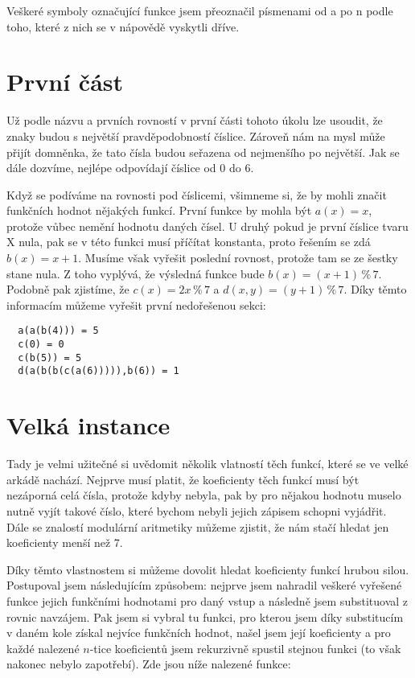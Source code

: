 \documentclass{fkssolpub}
\author{Ondřej Sedláček}
\begin{document}
Veškeré symboly označující funkce jsem přeoznačil písmenami od a po
n podle toho, které z nich se v nápovědě vyskytli dříve.

\section{První část}

Už podle názvu a prvních rovností v první části tohoto úkolu
lze usoudit, že znaky budou s největší pravděpodobností
číslice. Zároveň nám na mysl může přijít domněnka, že tato čísla budou
seřazena od nejmenšího po největší. Jak se dále dozvíme, nejlépe
odpovídají číslice od 0 do 6.

Když se podíváme na rovnosti pod číslicemi, všimneme si, že by
mohli značit funkčních hodnot nějakých funkcí. První funkce by
mohla být $a(x) = x$, protože vůbec nemění hodnotu daných čísel.
U druhý pokud je první číslice tvaru X nula, pak se v této funkci
musí příčítat konstanta, proto řešením se zdá $b(x) = x + 1$. Musíme však
vyřešit poslední rovnost, protože tam se ze šestky stane nula.
Z toho vyplývá, že výsledná funkce bude $b(x) = (x + 1) \, \% \, 7$.
Podobně pak zjistíme, že $c(x) = 2x \, \% \, 7$ a 
$d(x, y) = (y + 1) \, \% \, 7$.
Díky těmto informacím můžeme vyřešit první nedořešenou sekci:

\begin{verbatim}
  a(a(b(4))) = 5 
  c(0) = 0 
  c(b(5)) = 5 
  d(a(b(b(c(a(6))))),b(6)) = 1 
\end{verbatim}

\section{Velká instance}

Tady je velmi užitečné si uvědomit několik vlatností těch funkcí,
které se ve velké arkádě nachází. Nejprve musí platit, že koeficienty
těch funkcí musí být nezáporná celá čísla, protože kdyby nebyla, pak by pro
nějakou hodnotu muselo nutně vyjít takové číslo, které bychom
nebyli jejich zápisem schopni vyjádřit. Dále se znalostí modulární
aritmetiky můžeme zjistit, že nám stačí hledat jen koeficienty menší
než 7.

Díky těmto vlastnostem si můžeme dovolit hledat koeficienty funkcí
hrubou silou. Postupoval jsem následujícím způsobem: nejprve jsem
nahradil veškeré vyřešené funkce jejich funkčními hodnotami pro daný
vstup a následně jsem substituoval z rovnic navzájem. Pak jsem si
vybral tu funkci, pro kterou jsem díky substitucím v daném kole
získal nejvíce funkčních hodnot, našel jsem její koeficienty a 
pro každé nalezené $n$-tice koeficientů jsem rekurzivně spustil
stejnou funkci (to však nakonec nebylo zapotřebí). Zde jsou níže
nalezené funkce:
\end{document}
